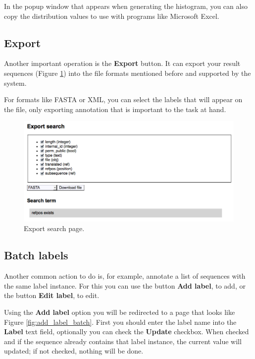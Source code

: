 In the popup window that appears when generating the histogram, you can also copy the distribution values
to use with programs like Microsoft Excel.

\subsection{Export}

Another important operation is the \textbf{Export} button.
It can export your result sequences (Figure \ref{fig:export_search})
into the file formats mentioned before and supported by the system.

For formats like FASTA or XML, you can select the labels that will appear on the file, only exporting annotation 
that is important to the task at hand.

\begin{figure}[ht]
  \centering
    \includegraphics[scale=0.4]{export_search.png}
  \caption{Export search page.}
  \label{fig:export_search}
\end{figure}

\subsection{Batch labels}

Another common action to do is, for example, annotate a list of sequences with the same label instance.
For this you can use the button \textbf{Add label}, to add, or the button \textbf{Edit label}, to edit.

Using the \textbf{Add label} option you will be redirected to a page that looks like Figure \ref{fig:add_label_batch}.
First you should enter the label name into the \textbf{Label} text field, optionally you can check the \textbf{Update}
checkbox. When checked and if the sequence already contains that label instance, the current value will updated; if not
checked, nothing will be done.

